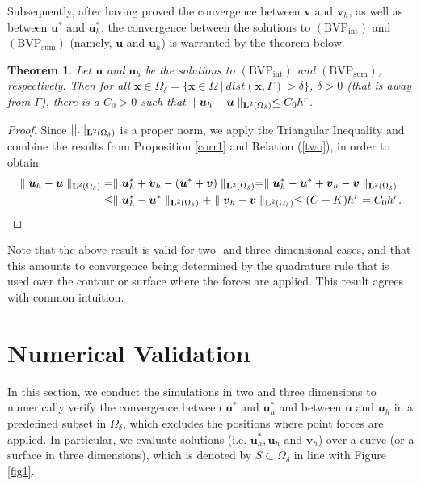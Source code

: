 \documentclass[pdflatex,sn-mathphys-num]{sn-jnl}
\newtheorem{theorem}{Theorem}%
\newtheorem*{lemma star}{Lemma}
\begin{document}
Subsequently, after having proved the convergence between $\boldsymbol{v}$ and $\boldsymbol{v}_h$, as well as between $\boldsymbol{u}^*$ and $\boldsymbol{u}_h^*$, the convergence between the solutions to $\mathrm{(BVP_{int})}$ and $\mathrm{(BVP_{sum})}$ (namely, $\boldsymbol{u}$ and $\boldsymbol{u}_h$) is warranted by the theorem below. 
\begin{theorem}
\label{Th_u_u_h}
    Let $\boldsymbol{u}$ and $\boldsymbol{u}_h$ be the solutions to $\mathrm{(BVP_{int})}$ and $\mathrm{(BVP_{sum})}$, respectively. Then for all $\boldsymbol{x} \in \Omega_\delta=\{\boldsymbol{x} \in \Omega \ | \ dist (\boldsymbol{x},\Gamma) >\delta\}$, $\delta > 0$ (that is away from $\Gamma$), there is a $C_0 > 0$ such that
$\parallel {\boldsymbol u}_h - {\boldsymbol u}\parallel_{{\bf L}^2(\Omega_{\delta})} \le C_0 h^{r}$.
\end{theorem}
\begin{proof}
    Since $||.||_{{\bf L}^2(\Omega_\delta)}$ is a proper norm,  we apply the Triangular Inequality and combine the results from Proposition \ref{corr1} and Relation (\ref{two}), in order to obtain
\begin{align*}
    \parallel {\boldsymbol{u}}_{h}-{\boldsymbol{u}} \parallel_{{\bf L}^2(\Omega_\delta)}
 &= \parallel \boldsymbol{u}_{h}^{*} +\boldsymbol{v}_{h} -(\boldsymbol{u}^{*}
+\boldsymbol{v})\parallel_{{\bf L}^2(\Omega_\delta)}= \parallel \boldsymbol{u}_{h}^{*}-\boldsymbol{u}^{*}
+\boldsymbol{v}_{h}-\boldsymbol{v}\parallel_{{\bf L}^2(\Omega_\delta)}\\
 &\leq \parallel \boldsymbol{u}_{h}^{*}-\boldsymbol{u}^{*}\parallel_{{\bf L}^2(\Omega_\delta)}
+\parallel \boldsymbol{v}_{h}-\boldsymbol{v}\parallel_{{\bf L}^2(\Omega_\delta)}
\le (C+K)h^{r}=C_0 h^{r}.
\end{align*}
\end{proof}

Note that the above result is valid for two- and three-dimensional cases, and that this amounts to convergence being determined by the quadrature rule that is used over the contour or surface where the forces are applied. This result agrees with common intuition.

\section{Numerical Validation}
\label{sec:4}
In this section, we conduct the simulations in two and three dimensions to numerically verify the convergence between $\boldsymbol{u}^*$ and $\boldsymbol{u}_h^*$ and between $\boldsymbol{u}$ and $\boldsymbol{u}_h$ in a predefined subset in $\Omega_\delta$, which excludes the positions where point forces are applied. In particular, we evaluate solutions (i.e. $\boldsymbol{u}^*_h, \boldsymbol{u}_h$ and $\boldsymbol{v}_h$) over a curve (or a surface in three dimensions), which is denoted by $S\subset \Omega_\delta$ in line with Figure \ref{fig1}.
\end{document}
